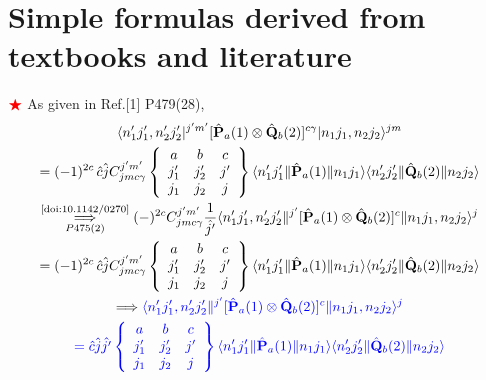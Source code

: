 \documentclass[master]{shnuthesis}
\begin{document}
\section{Simple formulas derived from textbooks and literature}
${\color{red} \bigstar}$ As given in Ref.[1] P479(28),
\begin{gather}
    \langle n_{1}^{\prime} j_{1}^{\prime}, n_{2}^{\prime} j_{2}^{\prime}|^{j^{\prime} m^{\prime}} [\hat{\mathbf{P}}_{a}(1) \otimes \hat{\mathbf{Q}}_{b}(2)]^{c \gamma}|n_{1} j_{1}, n_{2} j_{2} \rangle^{j m} \notag\\
    =(-1)^{2 c} \,\hat{c}\hat{j} C_{j m c \gamma}^{j^{\prime} m^{\prime}}
        \left\{\begin{array}{ccc}
        a & b & c \\
        j_{1}^{\prime} & j_{2}^{\prime} &     j^{\prime} \\
        j_{1} & j_{2} & j
        \end{array}\right\}
    \langle n_{1}^{\prime} j_{1}^{\prime}\|\hat{\mathbf{P}}_{a}(1)\| n_{1} j_{1}\rangle \langle n_{2}^{\prime} j_{2}^{\prime}\|\hat{\mathbf{Q}}_{b}(2)\| n_{2} j_{2}\rangle \\
    \underset{P475(2)}{\overset{\text{\cite{doi:10.1142/0270}}}{\Longrightarrow}} (-)^{2c}C_{j m c \gamma}^{j^\prime m^\prime}\frac{1}{\hat{j^\prime}} \langle n_{1}^{\prime} j_{1}^{\prime}, n_{2}^{\prime} j_{2}^{\prime}\|^{j^{\prime}} [\hat{\mathbf{P}}_{a}(1) \otimes \hat{\mathbf{Q}}_{b}(2)]^{c}\|n_{1} j_{1}, n_{2} j_{2} \rangle^{j} \notag\\
    =(-1)^{2 c} \,\hat{c}\hat{j} C_{j m c \gamma}^{j^{\prime} m^{\prime}}
        \left\{\begin{array}{ccc}
        a & b & c \\
        j_{1}^{\prime} & j_{2}^{\prime} &     j^{\prime} \\
        j_{1} & j_{2} & j
        \end{array}\right\}
    \langle n_{1}^{\prime} j_{1}^{\prime}\|\hat{\mathbf{P}}_{a}(1)\| n_{1} j_{1}\rangle \langle n_{2}^{\prime} j_{2}^{\prime}\|\hat{\mathbf{Q}}_{b}(2)\| n_{2} j_{2}\rangle \\
    \Longrightarrow {\color{blue} \langle n_{1}^{\prime} j_{1}^{\prime}, n_{2}^{\prime} j_{2}^{\prime}\|^{j^{\prime}} [\hat{\mathbf{P}}_{a}(1) \otimes \hat{\mathbf{Q}}_{b}(2)]^{c}\|n_{1} j_{1}, n_{2} j_{2} \rangle^{j} } \notag\\
    {\color{blue} = \hat{c}\hat{j}\hat{j^\prime}
        \left\{\begin{array}{ccc}
        a & b & c \\
        j_{1}^{\prime} & j_{2}^{\prime} &     j^{\prime} \\
        j_{1} & j_{2} & j
        \end{array}\right\}
    \langle n_{1}^{\prime} j_{1}^{\prime}\|\hat{\mathbf{P}}_{a}(1)\| n_{1} j_{1}\rangle \langle n_{2}^{\prime} j_{2}^{\prime}\|\hat{\mathbf{Q}}_{b}(2)\| n_{2} j_{2}\rangle } \label{abc}
\end{gather}
\end{document}
